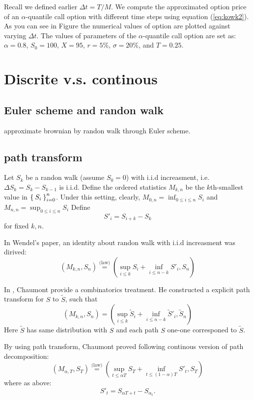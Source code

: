 \documentclass[11pt]{book}
\def\eqlaw{{\stackrel{\text{(law)}}{=}}}
\def\tS{{\widetilde{S}}}
\begin{document}
Recall we defined earlier $\Delta t = T / M$. We compute the approximated option price of an $\alpha$-quantile call option with different time steps using equation (\ref{eq:kowk2}). As you can see in Figure %
the numerical values of option are plotted against varying $\Delta t$. The values of parameters of the $\alpha$-quantile call option are set as: $ \alpha = 0.8$, $S_0 = 100$, $X = 95$, $r = 5\%$, $\sigma = 20\%$, and $T = 0.25$. 



 
 











\section{Discrite v.s. continous}
\subsection{Euler scheme and randon walk}
approximate brownian by randon walk through Euler scheme.

\subsection{path transform}
Let $S_k$ be a randon walk (assume $S_0=0$) 
with i.i.d increasment, i.e. 
$\Delta S_k = S_k -  S_{k-1}$ is i.i.d. 
Define the ordered statistics $M_{k,n}$ be the $k$th-smallest value in
$\Set{S_i}_{i=0}^n$. 
Under this setting, clearly, $M_{0,n} = \inf_{0\leq i\leq n}S_i$
and $M_{n,n} = \sup_{0\leq i\leq n}S_i$
Define 
\[S'_i = S_{i+k}-S_k\] 
for fixed $k, n$.  

In Wendel's paper\cite{Wendel1960}, an identity about randon walk with 
i.i.d increasment was dirived:
\begin{equation}\label{eq:dpathdec}
(M_{k,n}, S_n) \eqlaw (\sup_{i\leq k} S_i +\inf_{i\leq n-k} S'_i, S_n)
\end{equation}

In 
\cite{Chaumont1999}, Chaumont provide a combinatorics treatment. 
He constructed a explicit path transform for $S$ to $\tS$, such that 
\[
(M_{k,n}, S_n) = (\sup_{i\leq k} \tS_i+\inf_{i\leq n-k} \tS'_i, \tS_n)
\]
Here $\tS$ has same distribution with $S$ and each path $S$
 one-one corresponed to $\tS$.

By using path transform, Chaumont proved 
following continous version of path decomposition:
\begin{equation}\label{eq:cpathdec}
(M_{\alpha,T}, S_T) \eqlaw (\sup_{t\leq \alpha{T}} S_T +\inf_{t \leq (1-\alpha)T} S'_t, S_T)
\end{equation}
where as above:
\[
S'_t = S_{\alpha T+t} - S_{\alpha_t}.
\]
\end{document}
